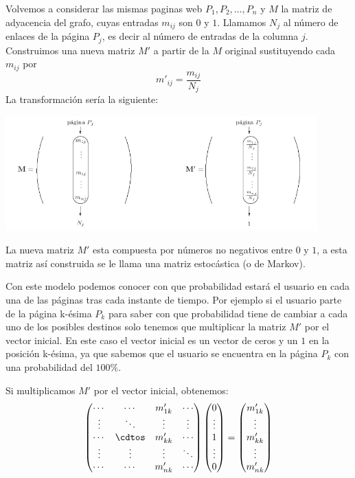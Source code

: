\documentclass[size=a4, parskip=half, titlepage=false, toc=flat, toc=bib, 12pt]{scrartcl}
\theoremstyle{theorem-style}
\theoremstyle{definition-style}
\theoremstyle{remark-style}
\theoremstyle{example-style}
\theoremstyle{definition-style}
\theoremstyle{remark-style}
\begin{document}
Volvemos a considerar las mismas paginas web $P_1, P_2, \dots, P_n$ y $M$ la matriz de adyacencia del grafo, cuyas entradas $m_{ij}$ son $0$ y $1$. Llamamos $N_j$ al número de enlaces de la página $P_j$,  es decir al número de entradas de la columna $j$. Construimos una nueva matriz $M'$ a partir de la $M$ original sustituyendo cada $m_{ij}$ por
$$m'_{ij} = \frac{m_{ij}}{N_j} $$
La transformación sería la siguiente:

\begin{center}
\includegraphics[width=0.9\textwidth]{./img/markov}
\end{center}

La nueva matriz $M'$ esta compuesta por números no negativos entre $0$ y $1$, a esta matriz así construida se le llama una matriz estocástica (o de Markov).

Con este modelo podemos conocer con que probabilidad estará el usuario en cada una de las páginas tras cada instante de tiempo. Por ejemplo si el usuario parte de la página k-ésima $P_k$ para saber con que probabilidad tiene de cambiar a cada uno de los posibles destinos solo tenemos que multiplicar la matriz $M'$ por el vector inicial. En este caso el vector inicial es un vector de ceros y un $1$ en la posición k-ésima, ya que sabemos que el usuario se encuentra en la página $P_k$ con una probabilidad del $100\%$.

Si multiplicamos $M'$ por el vector inicial, obtenemos:
$$\begin{pmatrix}
\cdots & \cdots & m'_{1k} & \cdots \\
\vdots & \ddots & \vdots & \vdots \\
\cdots & \cdtos & m'_{kk} & \cdots \\
\vdots & \vdots & \vdots & \ddots \\
\cdots & \cdots & m'_{nk} & \cdots \end{pmatrix} \begin{pmatrix}
0 \\
\vdots \\
1 \\
\vdots \\
0 \end{pmatrix} = \begin{pmatrix}
m'_{1k}\\
\vdots \\
m'_{kk} \\
\vdots \\
m'_{nk} \end{pmatrix}$$
\end{document}
